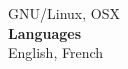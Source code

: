 \documentclass[11pt,letterpaper]{article}
\newcommand{\raisedrule}[2][0em]{\leaders\hbox{\rule[#1]{1pt}{#2}}\hfill}
\newcommand*{\sectionfont}{\Large\sffamily\mdseries\upshape}
\begin{document}
GNU/Linux, OSX\\[2ex]%
\textbf{Languages}\\%
English, French\\[3ex]%
%
%
%
%
\end{document}
